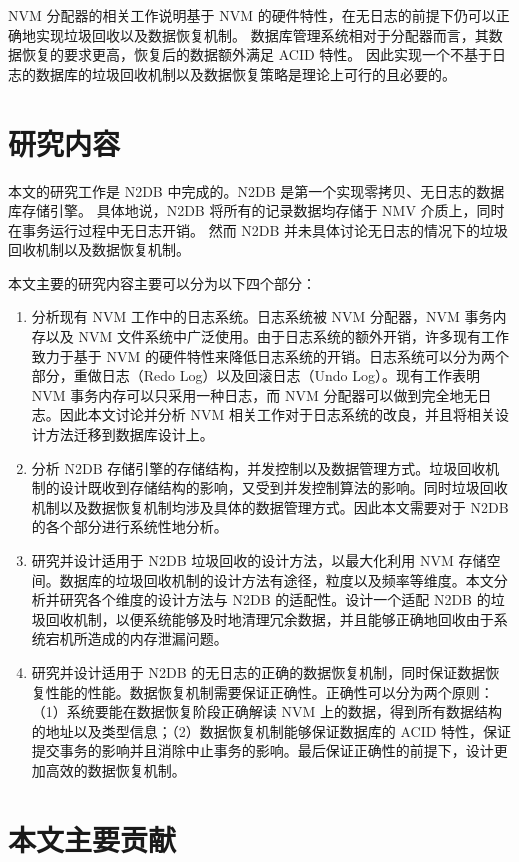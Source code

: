 NVM 分配器的相关工作说明基于 NVM 的硬件特性，在无日志的前提下仍可以正确地实现垃圾回收以及数据恢复机制。
数据库管理系统相对于分配器而言，其数据恢复的要求更高，恢复后的数据额外满足 ACID 特性。
因此实现一个不基于日志的数据库的垃圾回收机制以及数据恢复策略是理论上可行的且必要的。

\section{研究内容}

本文的研究工作是 N2DB 中完成的。N2DB 是第一个实现零拷贝、无日志的数据库存储引擎。
具体地说，N2DB 将所有的记录数据均存储于 NMV 介质上，同时在事务运行过程中无日志开销。
然而 N2DB 并未具体讨论无日志的情况下的垃圾回收机制以及数据恢复机制。

本文主要的研究内容主要可以分为以下四个部分：
\begin{enumerate}
    \item 分析现有 NVM 工作中的日志系统。日志系统被 NVM 分配器，NVM 事务内存以及 NVM 文件系统中广泛使用。由于日志系统的额外开销，许多现有工作致力于基于 NVM 的硬件特性来降低日志系统的开销。日志系统可以分为两个部分，重做日志（Redo Log）以及回滚日志（Undo Log）。现有工作表明 NVM 事务内存可以只采用一种日志，而 NVM 分配器可以做到完全地无日志。因此本文讨论并分析 NVM 相关工作对于日志系统的改良，并且将相关设计方法迁移到数据库设计上。
    \item 分析 N2DB 存储引擎的存储结构，并发控制以及数据管理方式。垃圾回收机制的设计既收到存储结构的影响，又受到并发控制算法的影响。同时垃圾回收机制以及数据恢复机制均涉及具体的数据管理方式。因此本文需要对于 N2DB 的各个部分进行系统性地分析。
    \item 研究并设计适用于 N2DB 垃圾回收的设计方法，以最大化利用 NVM 存储空间。数据库的垃圾回收机制的设计方法有途径，粒度以及频率等维度。本文分析并研究各个维度的设计方法与 N2DB 的适配性。设计一个适配 N2DB 的垃圾回收机制，以便系统能够及时地清理冗余数据，并且能够正确地回收由于系统宕机所造成的内存泄漏问题。
    \item 研究并设计适用于 N2DB 的无日志的正确的数据恢复机制，同时保证数据恢复性能的性能。数据恢复机制需要保证正确性。正确性可以分为两个原则：（1）系统要能在数据恢复阶段正确解读 NVM 上的数据，得到所有数据结构的地址以及类型信息；（2）数据恢复机制能够保证数据库的 ACID 特性，保证提交事务的影响并且消除中止事务的影响。最后保证正确性的前提下，设计更加高效的数据恢复机制。
\end{enumerate}

\section{本文主要贡献}

